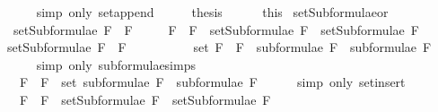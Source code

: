 \begin{isabellebody}
\ \ \ \ \isamarkupfalse%
\ {\isacharparenleft}simp\ only{\isacharcolon}\ set{\isacharunderscore}append{\isacharparenright}\isanewline
\ \ \isamarkupfalse%
\ \isamarkupfalse%
\ {\isacharquery}thesis\isanewline
\ \ \ \ \isamarkupfalse%
\ this\isanewline
{}\isamarkupfalse%
%
\endisatagproof
{\isafoldproof}%
%
\isadelimproof
\isanewline
%
\endisadelimproof
\isanewline
{}\isamarkupfalse%
\ setSubformulae{\isacharunderscore}or{\isacharcolon}\ \isanewline
\ \ {\isachardoublequoteopen}setSubformulae\ {\isacharparenleft}F{}\ \isactrlbold {\isasymor}\ F{}{\isacharparenright}\ \isanewline
\ \ \ {\isacharequal}\ {\isacharbraceleft}F{}\ \isactrlbold {\isasymor}\ F{}{\isacharbraceright}\ {\isasymunion}\ {\isacharparenleft}setSubformulae\ F{}\ {\isasymunion}\ setSubformulae\ F{}{\isacharparenright}{\isachardoublequoteclose}\isanewline
%
\isadelimproof
%
\endisadelimproof
%
\isatagproof
{}\isamarkupfalse%
\ {\isacharminus}\isanewline
\ \ \isamarkupfalse%
\ {\isachardoublequoteopen}setSubformulae\ {\isacharparenleft}F{}\ \isactrlbold {\isasymor}\ F{}{\isacharparenright}\ \isanewline
\ \ \ \ \ \ \ \ {\isacharequal}\ set\ {\isacharparenleft}{\isacharparenleft}F{}\ \isactrlbold {\isasymor}\ F{}{\isacharparenright}\ {\isacharhash}\ {\isacharparenleft}subformulae\ F{}\ {\isacharat}\ subformulae\ F{}{\isacharparenright}{\isacharparenright}{\isachardoublequoteclose}\isanewline
\ \ \ \ \isamarkupfalse%
\ {\isacharparenleft}simp\ only{\isacharcolon}\ subformulae{\isachardot}simps{\isacharparenleft}{}{\isacharparenright}{\isacharparenright}\isanewline
\ \ \isamarkupfalse%
\ \isamarkupfalse%
\ {\isachardoublequoteopen}{\isasymdots}\ {\isacharequal}\ {\isacharbraceleft}F{}\ \isactrlbold {\isasymor}\ F{}{\isacharbraceright}\ {\isasymunion}\ {\isacharparenleft}set\ {\isacharparenleft}subformulae\ F{}\ {\isacharat}\ subformulae\ F{}{\isacharparenright}{\isacharparenright}{\isachardoublequoteclose}\isanewline
\ \ \ \ \isamarkupfalse%
\ {\isacharparenleft}simp\ only{\isacharcolon}\ set{\isacharunderscore}insert{\isacharparenright}\isanewline
\ \ \isamarkupfalse%
\ \isamarkupfalse%
\ {\isachardoublequoteopen}{\isasymdots}\ {\isacharequal}\ {\isacharbraceleft}F{}\ \isactrlbold {\isasymor}\ F{}{\isacharbraceright}\ {\isasymunion}\ {\isacharparenleft}setSubformulae\ F{}\ {\isasymunion}\ setSubformulae\ F{}{\isacharparenright}{\isachardoublequoteclose}\isanewline

\end{isabellebody}
